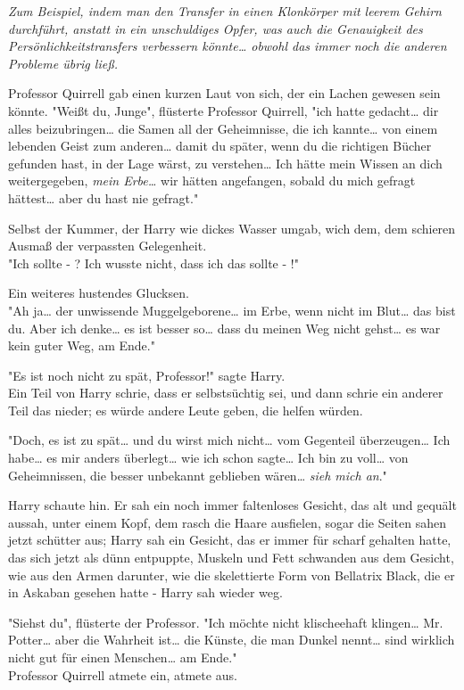 {\emph{Zum Beispiel, indem man den Transfer in einen Klonkörper mit leerem Gehirn durchführt, anstatt in ein unschuldiges Opfer, was auch die Genauigkeit des Persönlichkeitstransfers verbessern könnte… obwohl das immer noch die anderen Probleme übrig ließ.}

Professor Quirrell gab einen kurzen Laut von sich, der ein Lachen gewesen sein könnte. "Weißt du, Junge", flüsterte Professor Quirrell, "ich hatte gedacht… dir alles beizubringen… die Samen all der Geheimnisse, die ich kannte… von einem lebenden Geist zum anderen… damit du später, wenn du die richtigen Bücher gefunden hast, in der Lage wärst, zu verstehen… Ich hätte mein Wissen an dich weitergegeben, \emph{mein Erbe…} wir hätten angefangen, sobald du mich gefragt hättest… aber du hast nie gefragt."

Selbst der Kummer, der Harry wie dickes Wasser umgab, wich dem, dem schieren Ausmaß der verpassten Gelegenheit.\\ "Ich sollte - ? Ich wusste nicht, dass ich das sollte - !"

Ein weiteres hustendes Glucksen.\\ "Ah ja… der unwissende Muggelgeborene… im Erbe, wenn nicht im Blut… das bist du. Aber ich denke… es ist besser so… dass du meinen Weg nicht gehst… es war kein guter Weg, am Ende."

"Es ist noch nicht zu spät, Professor!" sagte Harry.\\ Ein Teil von Harry schrie, dass er selbstsüchtig sei, und dann schrie ein anderer Teil das nieder; es würde andere Leute geben, die helfen würden.

"Doch, es ist zu spät… und du wirst mich nicht… vom Gegenteil überzeugen… Ich habe… es mir anders überlegt… wie ich schon sagte… Ich bin zu voll… von Geheimnissen, die besser unbekannt geblieben wären… \emph{sieh mich an}."

Harry schaute hin. Er sah ein noch immer faltenloses Gesicht, das alt und gequält aussah, unter einem Kopf, dem rasch die Haare ausfielen, sogar die Seiten sahen jetzt schütter aus; Harry sah ein Gesicht, das er immer für scharf gehalten hatte, das sich jetzt als dünn entpuppte, Muskeln und Fett schwanden aus dem Gesicht, wie aus den Armen darunter, wie die skelettierte Form von Bellatrix Black, die er in Askaban gesehen hatte - Harry sah wieder weg.

"Siehst du", flüsterte der Professor. "Ich möchte nicht klischeehaft klingen… Mr. Potter… aber die Wahrheit ist… die Künste, die man Dunkel nennt… sind wirklich nicht gut für einen Menschen… am Ende."\\ Professor Quirrell atmete ein, atmete aus.

}
